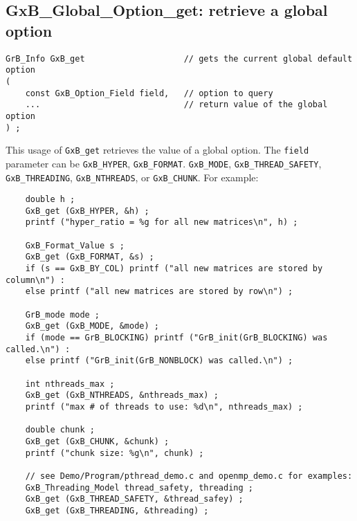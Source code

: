 \documentclass[12pt]{article}
\begin{document}
\subsection{{\sf GxB\_Global\_Option\_get:} retrieve a global option}
\label{gxbget}

\begin{mdframed}[userdefinedwidth=6in]
{\footnotesize
\begin{verbatim}
GrB_Info GxB_get                    // gets the current global default option
(
    const GxB_Option_Field field,   // option to query
    ...                             // return value of the global option
) ;
\end{verbatim} } \end{mdframed}

This usage of \verb'GxB_get' retrieves the value of a global option.  The
\verb'field' parameter can be \verb'GxB_HYPER', \verb'GxB_FORMAT'.
\verb'GxB_MODE', \verb'GxB_THREAD_SAFETY', \verb'GxB_THREADING',
\verb'GxB_NTHREADS', or \verb'GxB_CHUNK'.
For example:

{\footnotesize
\begin{verbatim}
    double h ;
    GxB_get (GxB_HYPER, &h) ;
    printf ("hyper_ratio = %g for all new matrices\n", h) ;

    GxB_Format_Value s ;
    GxB_get (GxB_FORMAT, &s) ;
    if (s == GxB_BY_COL) printf ("all new matrices are stored by column\n") :
    else printf ("all new matrices are stored by row\n") ;

    GrB_mode mode ;
    GxB_get (GxB_MODE, &mode) ;
    if (mode == GrB_BLOCKING) printf ("GrB_init(GrB_BLOCKING) was called.\n") :
    else printf ("GrB_init(GrB_NONBLOCK) was called.\n") ;

    int nthreads_max ;
    GxB_get (GxB_NTHREADS, &nthreads_max) ;
    printf ("max # of threads to use: %d\n", nthreads_max) ;

    double chunk ;
    GxB_get (GxB_CHUNK, &chunk) ;
    printf ("chunk size: %g\n", chunk) ;

    // see Demo/Program/pthread_demo.c and openmp_demo.c for examples:
    GxB_Threading_Model thread_safety, threading ;
    GxB_get (GxB_THREAD_SAFETY, &thread_safey) ;
    GxB_get (GxB_THREADING, &threading) ; \end{verbatim} }

\newpage
\end{document}
